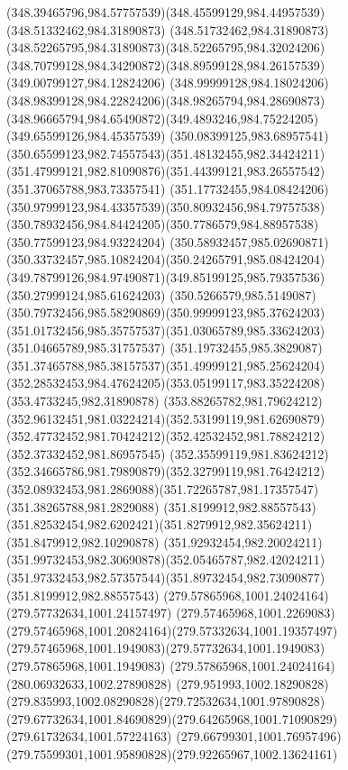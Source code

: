 {{		\curveto(348.39465796,984.57757539)(348.45599129,984.44957539)(348.51332462,984.31890873)
		\curveto(348.51732462,984.31890873)(348.52265795,984.31890873)(348.52265795,984.32024206)
		\curveto(348.70799128,984.34290872)(348.89599128,984.26157539)(349.00799127,984.12824206)
		\curveto(348.99999128,984.18024206)(348.98399128,984.22824206)(348.98265794,984.28690873)
		\curveto(348.96665794,984.65490872)(349.4893246,984.75224205)(349.65599126,984.45357539)
		\curveto(350.08399125,983.68957541)(350.65599123,982.74557543)(351.48132455,982.34424211)
		\curveto(351.47999121,982.81090876)(351.44399121,983.26557542)(351.37065788,983.73357541)
		\curveto(351.17732455,984.08424206)(350.97999123,984.43357539)(350.80932456,984.79757538)
		\curveto(350.78932456,984.84424205)(350.7786579,984.88957538)(350.77599123,984.93224204)
		\curveto(350.58932457,985.02690871)(350.33732457,985.10824204)(350.24265791,985.08424204)
		\curveto(349.78799126,984.97490871)(349.85199125,985.79357536)(350.27999124,985.61624203)
		\curveto(350.5266579,985.5149087)(350.79732456,985.58290869)(350.99999123,985.37624203)
		\curveto(351.01732456,985.35757537)(351.03065789,985.33624203)(351.04665789,985.31757537)
		\curveto(351.19732455,985.3829087)(351.37465788,985.38157537)(351.49999121,985.25624204)
		\curveto(352.28532453,984.47624205)(353.05199117,983.35224208)(353.4733245,982.31890878)
		\curveto(353.88265782,981.79624212)(352.96132451,981.03224214)(352.53199119,981.62690879)
		\curveto(352.47732452,981.70424212)(352.42532452,981.78824212)(352.37332452,981.86957545)
		\curveto(352.35599119,981.83624212)(352.34665786,981.79890879)(352.32799119,981.76424212)
		\curveto(352.08932453,981.2869088)(351.72265787,981.17357547)(351.38265788,981.2829088)
		\moveto(351.8199912,982.88557543)
		\curveto(351.82532454,982.6202421)(351.8279912,982.35624211)(351.8479912,982.10290878)
		\curveto(351.92932454,982.20024211)(351.99732453,982.30690878)(352.05465787,982.42024211)
		\curveto(351.97332453,982.57357544)(351.89732454,982.73090877)(351.8199912,982.88557543)
		\moveto(279.57865968,1001.24024164)
		\lineto(279.57732634,1001.24157497)
		\curveto(279.57465968,1001.2269083)(279.57465968,1001.20824164)(279.57332634,1001.19357497)
		\curveto(279.57465968,1001.1949083)(279.57732634,1001.1949083)(279.57865968,1001.1949083)
		\lineto(279.57865968,1001.24024164)
		\moveto(280.06932633,1002.27890828)
		\curveto(279.951993,1002.18290828)(279.835993,1002.08290828)(279.72532634,1001.97890828)
		\curveto(279.67732634,1001.84690829)(279.64265968,1001.71090829)(279.61732634,1001.57224163)
		\curveto(279.66799301,1001.76957496)(279.75599301,1001.95890828)(279.92265967,1002.13624161)
}}
